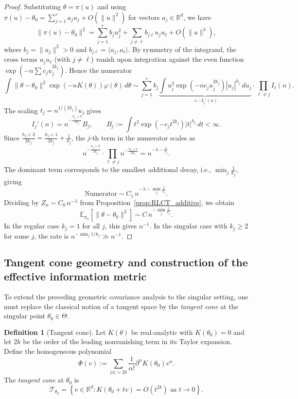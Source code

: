 \documentclass[11pt,letterpaper]{amsart}
\numberwithin{equation}{section}
\theoremstyle{plain}
\theoremstyle{definition}
\newtheorem{definition}[theorem]{Definition}
\theoremstyle{remark}
\begin{document}
\begin{proof}
Substituting $\theta = \pi(u)$ and using $\pi(u) - \theta_0 = \sum_{j=1}^r a_j u_j + O(\|u\|^2)$ for vectors $a_j \in \mathbb{R}^d$, we have
\[
\|\pi(u) - \theta_0\|^2 = \sum_{j=1}^r b_j u_j^2 + \sum_{j \neq \ell} b_{j\ell} u_j u_\ell + O(\|u\|^3),
\]
where $b_j = \|a_j\|^2 > 0$ and $b_{j\ell} = \langle a_j, a_\ell \rangle$. By symmetry of the integrand, the cross terms $u_j u_\ell$ (with $j \neq \ell$) vanish upon integration against the even function $\exp(-n \sum c_j u_j^{2k_j})$. Hence the numerator
\[
\int \|\theta - \theta_0\|^2 \exp(-nK(\theta))\varphi(\theta)\,d\theta
\sim
\sum_{j=1}^r b_j \underbrace{\int u_j^2 \exp(-nc_j u_j^{2k_j}) |u_j|^{h_j}\,du_j}_{=:I_j'(n)} \cdot \prod_{\ell \neq j} I_\ell(n).
\]
The scaling $t_j = n^{1/(2k_j)}u_j$ gives
\[
I_j'(n) = n^{-\frac{h_j+3}{2k_j}} B_j,
\qquad
B_j := \int t^2 \exp(-c_j t^{2k_j})|t|^{h_j}\,dt < \infty.
\]
Since $\frac{h_j+3}{2k_j} = \frac{h_j+1}{2k_j} + \frac{1}{k_j}$, the $j$-th term in the numerator scales as
\[
n^{-\frac{h_j+3}{2k_j}} \cdot \prod_{\ell \neq j} n^{-\frac{h_\ell+1}{2k_\ell}} = n^{-\lambda - \frac{1}{k_j}}.
\]
The dominant term corresponds to the smallest additional decay, i.e., $\min_j \frac{1}{k_j}$, giving
\[
\text{Numerator} \sim C_1 \, n^{-\lambda - \min_j \frac{1}{k_j}}.
\]
Dividing by $Z_n \sim C_0 \, n^{-\lambda}$ from Proposition~\ref{prop:RLCT_additive}, we obtain
\[
\mathbb{E}_{\pi_n}[\|\theta - \theta_0\|^2] \sim C \, n^{-\min_j \frac{1}{k_j}}.
\]
In the regular case $k_j = 1$ for all $j$, this gives $n^{-1}$. In the singular case with $k_j \geq 2$ for some $j$, the rate is $n^{-\min_j 1/k_j} \gg n^{-1}$.
\end{proof}


\subsection{Tangent cone geometry and construction of the effective information metric}

To extend the preceding geometric covariance analysis to the singular setting, one must replace the classical notion of a tangent space by the \emph{tangent cone} at the singular point \(\theta_0 \in \Theta\).

\begin{definition}[Tangent cone]
Let $K(\theta)$ be real-analytic with $K(\theta_0)=0$ and let $2k$ be the order of the leading nonvanishing term in its Taylor expansion. Define the homogeneous polynomial
\[
\Phi(v) := \sum_{|\alpha| = 2k} \frac{1}{\alpha!} \partial^\alpha K(\theta_0) v^\alpha.
\]
The \emph{tangent cone} at $\theta_0$ is
\[
\mathcal{T}_{\theta_0}
=
\left\{ v \in \mathbb{R}^d : K(\theta_0 + tv) = O(t^{2k}) \text{ as } t \to 0 \right\}.
\]
\end{definition}
\end{document}
